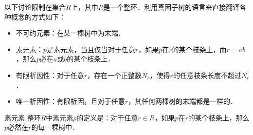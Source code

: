 以下讨论限制在集合$R$上，其中$R$是一个整环．利用真因子树的语言来直接翻译各种概念的方式如下：

\begin{itemize}
\item 不可约元素：在某一棵树中为末端．
\item 素元素：$p$是素元素，当且仅当对于任意$r$，如果$p$在$r$的某个枝条上，而$r=ab$，那么$p$必在$a$或$b$的某个枝条上．
\item 有限析因性：对于任意$r$，存在一个正整数$N_r$，使得$r$的任意枝条长度不超过$N_r$．
\item 唯一析因性：有限析因，且对于任意$r$，其任何两棵树的末端都是一样的．
\end{itemize}

\begin{theorem}{素元素}
整环$R$中素元素$p$的定义是：对于任意$r\in R$，如果$p$在$r$的某个枝条上，那么$p$必然在$r$的每一棵树中．
\end{theorem}




